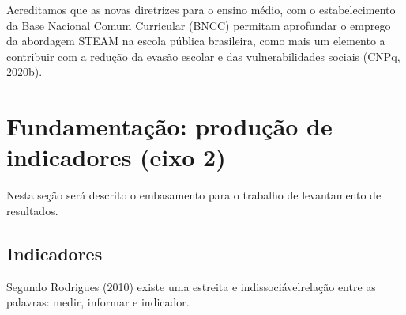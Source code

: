 \documentclass[
12pt,		%
openright,	%
twoside,  %
a4paper,			%
chapter=TITLE,		%
english,			%
french,				%
spanish,			%
brazil				%
]{USPSC-classe/USPSC}
\begin{document}
\noindent\begin{center}\mbox{\centering{}}\end{center}


Acreditamos que as novas diretrizes para o ensino m\'edio, com o estabelecimento da Base Nacional Comum Curricular (BNCC) permitam aprofundar o emprego da abordagem STEAM na escola p\'ublica brasileira, como mais um elemento a contribuir com a redu\c{c}\~ao da evas\~ao escolar e das vulnerabilidades sociais  (CNPq, 2020b).

















\section[Fundamenta\c{c}\~ao: produ\c{c}\~ao de indicadores (eixo 2)]{Fundamenta\c{c}\~ao: produ\c{c}\~ao de indicadores (eixo 2)}\label{Fundamenta\c{c}\~ao: produ\c{c}\~ao de indicadores (eixo 2)}
Nesta se\c{c}\~ao ser\'a descrito o embasamento para o trabalho de levantamento de resultados.

















\subsection[Indicadores]{Indicadores}\label{Indicadores}
Segundo  Rodrigues (2010)  existe uma \textquotedbl estreita e indissoci\'avel\textquotedbl  rela\c{c}\~ao entre as palavras: medir, informar e \textquotedbl indicador\textquotedbl .
\end{document}
